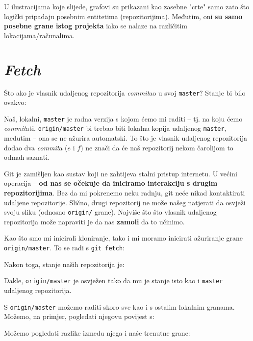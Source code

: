 

U ilustracijama koje slijede, grafovi su prikazani kao zasebne "crte" samo zato što logički pripadaju posebnim entitetima (repozitorijima).
Međutim, oni \textbf{su samo posebne grane istog projekta} iako se nalaze na različitim lokacijama/računalima.

\section*{\emph{Fetch}}

Što ako je vlasnik udaljenog repozitorija \emph{commit}ao u svoj \verb+master+?
Stanje bi bilo ovakvo:



Naš, lokalni, \verb+master+ je radna verzija s kojom ćemo mi raditi -- tj. na koju ćemo \emph{commit}ati.
\verb+origin/master+ bi trebao biti lokalna kopija udaljenog \verb+master+, međutim -- ona se ne ažurira automatski.
To što je vlasnik udaljenog repozitorija dodao dva \emph{commit}a ($e$ i $f$) ne znači da će naš repozitorij nekom čarolijom to odmah saznati.

Git je zamišljen kao sustav koji ne zahtijeva stalni pristup internetu.
U većini operacija -- \textbf{od nas se očekuje da iniciramo interakciju s drugim repozitorijima}.
Bez da mi pokrenemo neku radnju, git neće nikad kontaktirati udaljene repozitorije.
Slično, drugi repozitorij ne može našeg natjerati da osvježi svoju sliku (odnosno \verb+origin/+ grane).
Najviše što što vlasnik udaljenog repozitorija može napraviti je da nas \textbf{zamoli} da to učinimo.

Kao što smo mi inicirali kloniranje, tako i mi moramo inicirati ažuriranje grane \verb+origin/master+.
To se radi s \verb+git fetch+:



Nakon toga, stanje naših repozitorija je:



Dakle, \verb+origin/master+ je osvježen tako da mu je stanje isto kao i \verb+master+ udaljenog repozitorija.

S \verb+origin/master+ možemo raditi skoro sve kao i s ostalim lokalnim granama.
Možemo, na primjer, pogledati njegovu povijest s:


Možemo pogledati razlike između njega i naše trenutne grane:

